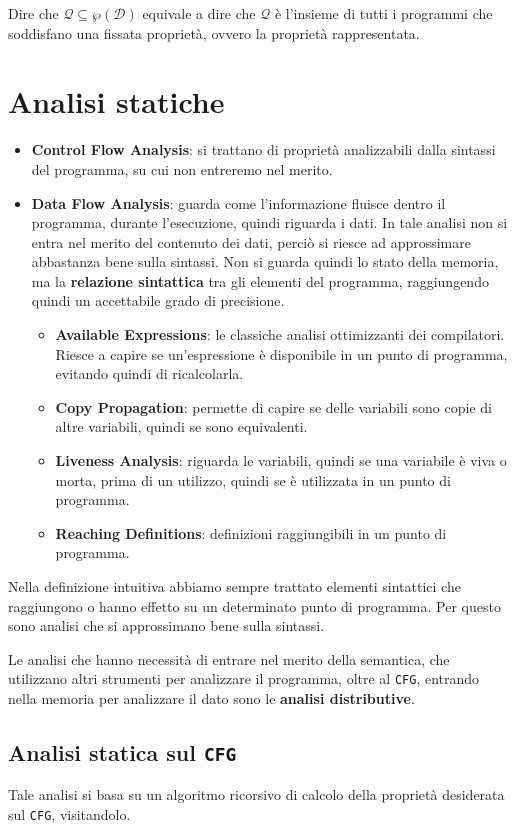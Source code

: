 Dire che $\mathcal{Q} \subseteq \wp(\mathcal{D})$ equivale a dire che $\mathcal{Q}$ è l'insieme di tutti i 
programmi che soddisfano una fissata proprietà, ovvero la proprietà rappresentata.
\section{Analisi statiche}
\begin{itemize}
    \item \textbf{Control Flow Analysis}: si trattano di proprietà analizzabili dalla sintassi del programma,
    su cui non entreremo nel merito.
    \item \textbf{Data Flow Analysis}: guarda come l'informazione fluisce dentro il programma, durante 
    l'esecuzione, quindi riguarda i dati. In tale analisi non si entra nel merito del contenuto dei dati,
    perciò si riesce ad approssimare abbastanza bene sulla sintassi. Non si guarda quindi lo stato della memoria, 
    ma la \textbf{relazione sintattica} tra gli elementi del programma, raggiungendo quindi un accettabile grado 
    di precisione.
    \begin{itemize}
        \item \textbf{Available Expressions}: le classiche analisi ottimizzanti dei compilatori. 
        Riesce a capire se un'espressione è disponibile in un punto di programma, evitando quindi di
        ricalcolarla.
        \item \textbf{Copy Propagation}: permette di capire se delle variabili sono copie di altre 
        variabili, quindi se sono equivalenti.
        \item \textbf{Liveness Analysis}: riguarda le variabili, quindi se una variabile è viva o morta,
        prima di un utilizzo, quindi se è utilizzata in un punto di programma.
        \item \textbf{Reaching Definitions}: definizioni raggiungibili in un punto di programma.
    \end{itemize}
\end{itemize}
Nella definizione intuitiva abbiamo sempre trattato elementi sintattici che raggiungono o hanno 
effetto su un determinato punto di programma. Per questo sono analisi che si approssimano bene sulla 
sintassi.

Le analisi che hanno necessità di entrare nel merito della semantica, che utilizzano altri strumenti 
per analizzare il programma, oltre al \texttt{CFG}, entrando nella memoria per analizzare il dato 
sono le \textbf{analisi distributive}.
\subsection{Analisi statica sul \texttt{CFG}}
Tale analisi si basa su un algoritmo ricorsivo di calcolo della proprietà desiderata sul \texttt{CFG}, visitandolo.

